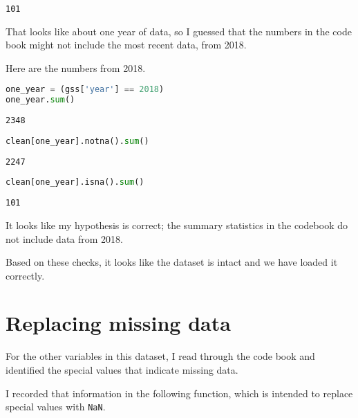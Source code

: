 \begin{lstlisting}[]
101
\end{lstlisting}

That looks like about one year of data, so I guessed that the numbers in
the code book might not include the most recent data, from 2018.

Here are the numbers from 2018.

\begin{lstlisting}[language=Python]
one_year = (gss['year'] == 2018)
one_year.sum()
\end{lstlisting}

\begin{lstlisting}[]
2348
\end{lstlisting}

\begin{lstlisting}[language=Python]
clean[one_year].notna().sum()
\end{lstlisting}

\begin{lstlisting}[]
2247
\end{lstlisting}

\begin{lstlisting}[language=Python]
clean[one_year].isna().sum()
\end{lstlisting}

\begin{lstlisting}[]
101
\end{lstlisting}

It looks like my hypothesis is correct; the summary statistics in the
codebook do not include data from 2018.

Based on these checks, it looks like the dataset is intact and we have
loaded it correctly.

\hypertarget{replacing-missing-data}{%
\section{Replacing missing data}\label{replacing-missing-data}}

For the other variables in this dataset, I read through the code book
and identified the special values that indicate missing data.

I recorded that information in the following function, which is intended
to replace special values with \passthrough{\lstinline!NaN!}.

